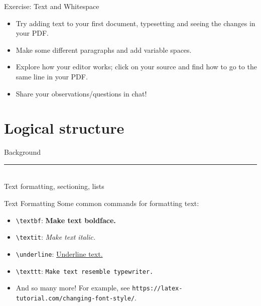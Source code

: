 \documentclass{beamer}
\begin{document}
{  \begin{frame}{Exercise: Text and Whitespace}
    \begin{itemize}
      \item Try adding text to your first document, typesetting and seeing the changes in your PDF.
      \item Make some different paragraphs and add variable spaces.
      \item Explore how your editor works; click on your source and find how to go to the same line in your PDF.
      \item Share your observations/questions in chat!
    \end{itemize}
  \end{frame}

  \section{Logical structure}

  \begin{frame}[plain]
    \vfill
    \centering
    \begin{beamercolorbox}[sep=8pt,center,shadow=true,rounded=true]{Background}
      \insertsectionhead\par%
      \color{davisblue}\noindent\rule{10cm}{1pt} \\
      \footnotesize{Text formatting, sectioning, lists}
    \end{beamercolorbox}
    \vfill
  \end{frame}

  \begin{frame}{Text Formatting}
    Some common commands for formatting text:
    \begin{itemize}
      \item \texttt{\textbackslash textbf}: \textbf{Make text boldface.}
      \item \texttt{\textbackslash textit}: \textit{Make text italic.}
      \item \texttt{\textbackslash underline}: \underline{Underline text.}
      \item \texttt{\textbackslash texttt}: \texttt{Make text resemble typewriter.}
      \item And so many more! For example, see \texttt{https://latex-tutorial.com/changing-font-style/}.
    \end{itemize}
  \end{frame}

}
\end{document}

